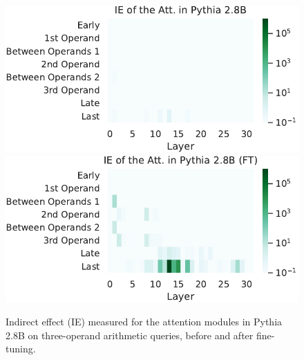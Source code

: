 \documentclass[11pt]{article}
\begin{document}
\begin{figure}[t]
    \centering
    \includegraphics[width=\columnwidth]{img/pythia/3ops/pythia-3ops-attn.pdf}
    \includegraphics[width=\columnwidth]{img/pythia/3ops/pythia-ft-3ops-attn.pdf}
    \caption{Indirect effect (IE) measured for the attention modules in Pythia 2.8B on three-operand arithmetic queries, before and after fine-tuning.}
    \label{fig:pythia-3ops-attn}
\end{figure}
\end{document}
